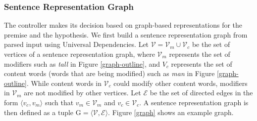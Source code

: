 \documentclass[11pt,a4paper]{article}
\begin{document}
\subsubsection{Sentence Representation Graph}
The controller makes its decision based on  graph-based representations for the premise
and the hypothesis. We first build a sentence representation graph from
parsed input using Universal Dependencies. Let $\mathcal{V} = \mathcal{V}_{m} \cup \mathcal{V}_{c}$ be the set of vertices of a sentence representation graph, where $\mathcal{V}_{m}$ represents the set of modifiers such as \textit{tall} in Figure \ref{graph-outline}, and ${V}_{c}$ represents the set of content words (words that are being modified) such as \textit{man} in Figure \ref{graph-outline}. While content words in $\mathcal{V}_{c}$ could modify other content words, modifiers in $\mathcal{V}_{m}$ are not modified by other vertices. Let $\mathcal{E}$ be the set of directed edges in the form $\langle v_c, v_m \rangle$ such that $v_m \in \mathcal{V}_{m}$ and $v_c \in \mathcal{V}_{c}$. A sentence representation graph is then defined as a tuple $\mathrm{G} = \langle \mathcal{V}, \mathcal{E} \rangle$. Figure \ref{graph} shows an example graph.
\end{document}
